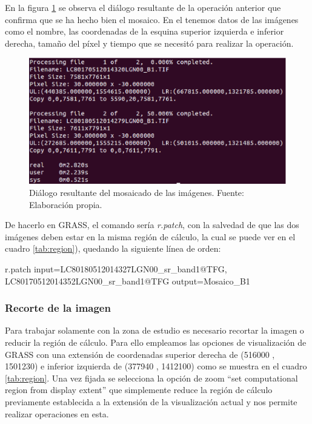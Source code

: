 En la figura \ref{fig:dialogomosaico} se observa el diálogo resultante de la operación anterior que confirma que se ha hecho bien el mosaico. En el tenemos datos de las imágenes como el nombre, las coordenadas de la esquina superior izquierda e inferior derecha, tamaño del píxel y tiempo que se necesitó para realizar la operación.\Sep

\begin{figure}
	\centering
	\includegraphics[width=0.8\linewidth]{./Imagenes/Dialogo_mosaico.eps}
	\caption[Diálogo del mosaicado]{Diálogo resultante del mosaicado de las imágenes. Fuente: Elaboración propia.}
	\label{fig:dialogomosaico}
\end{figure}

De hacerlo en GRASS, el comando sería \textit{r.patch}, con la salvedad de que las dos imágenes deben estar en la misma región de cálculo, la cual se puede ver en el cuadro \ref{tab:region}), quedando la siguiente línea de orden:\SmallSep

\begin{center}
\begin{boxedverbatim}
	r.patch input=LC80180512014327LGN00_sr_band1@TFG,
	              LC80170512014352LGN00_sr_band1@TFG 
	output=Mosaico_B1
\end{boxedverbatim}
\end{center}

\subsubsection{Recorte de la imagen}
Para trabajar solamente con la zona de estudio es necesario recortar la imagen o reducir la región de cálculo. Para ello empleamos las opciones de visualización de GRASS con una extensión de coordenadas superior derecha de (516000 , 1501230) e inferior izquierda de (377940 , 1412100) como se muestra en el cuadro \ref{tab:region}. Una vez fijada se selecciona la opción de zoom ``set computational region from display extent'' que simplemente reduce la región de cálculo previamente establecida a la extensión de la visualización actual y nos permite realizar operaciones en esta.\Sep


